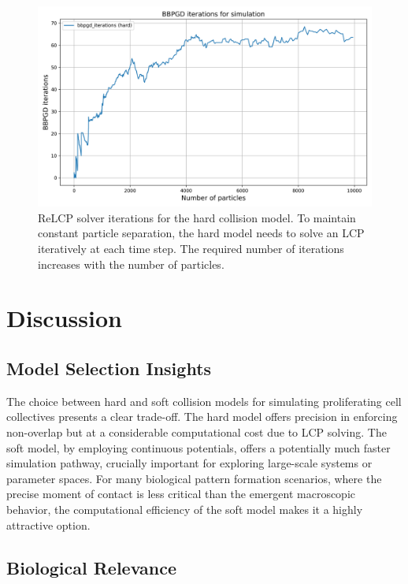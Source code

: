 \documentclass[conference]{IEEEtran}
\begin{document}
\begin{figure}
    \centering
    \includegraphics[width=\linewidth]{figures/comparisons/bbpgd_iterations_simulation.png}
    \caption{ReLCP solver iterations for the hard collision model. To maintain constant particle separation, the hard model needs to solve an LCP iteratively at each time step. The required number of iterations increases with the number of particles.}
    \label{figure:bbpgd_iterations_simulation}
\end{figure}

\newpage
\section{Discussion}
\subsection{Model Selection Insights}


The choice between hard and soft collision models for simulating proliferating cell collectives presents a clear trade-off. The hard model offers precision in enforcing non-overlap but at a considerable computational cost due to LCP solving. The soft model, by employing continuous potentials, offers a potentially much faster simulation pathway, crucially important for exploring large-scale systems or parameter spaces. For many biological pattern formation scenarios, where the precise moment of contact is less critical than the emergent macroscopic behavior, the computational efficiency of the soft model makes it a highly attractive option.

\subsection{Biological Relevance}
\end{document}
